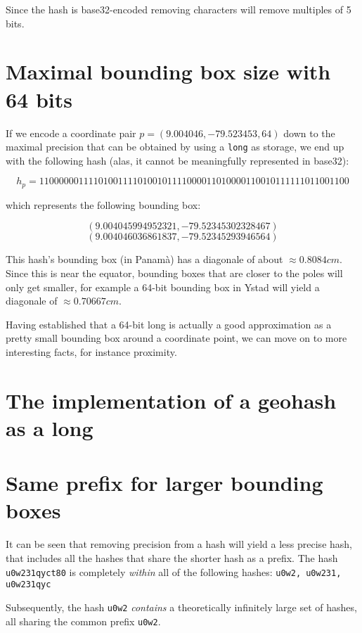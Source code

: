 \documentclass[a4paper,11pt,twoside]{scrartcl}
\begin{document}
Since the hash is base32-encoded removing characters will remove multiples of 5 bits.


\section{Maximal bounding box size with 64 bits} %
\label{sec:maximal_precision_with_64_bits}
If we encode a coordinate pair $p = (9.004046, -79.523453, 64)$ down to the maximal precision that can be obtained by using a \texttt{long} as storage, we end up with the following hash (alas, it cannot be meaningfully represented in base32):

\[
h_p = 110000001111010011110100101111000011010000110010111111011001100
\]

which represents the following bounding box:

\[
(9.004045994952321,-79.52345302328467)
\]
\[
(9.004046036861837,-79.52345293946564)
\]

This hash's bounding box (in Panamà) has a diagonale of about $\approx 0.8084 cm$. Since this is near the equator, bounding boxes that are closer to the poles will only get smaller, for example a 64-bit bounding box in Ystad will yield a diagonale of $\approx 0.70667 cm$.

Having established that a 64-bit long is actually a good approximation as a pretty small bounding box around a coordinate point, we can move on to more interesting facts, for instance proximity.


\section{The implementation of a geohash as a long} %
\label{sec:the_implementation_of_a_geohash_as_a_long}




\section{Same prefix for larger bounding boxes} %
\label{sec:same_prefix_for_larger_bounding_boxes}
It can be seen that removing precision from a hash will yield a less precise hash, that includes all the hashes that share the shorter hash as a prefix.
The hash \texttt{u0w231qyct80} is completely \emph{within} all of the following hashes: \texttt{u0w2, u0w231, u0w231qyc}

Subsequently, the hash \texttt{u0w2} \emph{contains} a theoretically infinitely large set of hashes, all sharing the common prefix \texttt{u0w2}.
\end{document}
